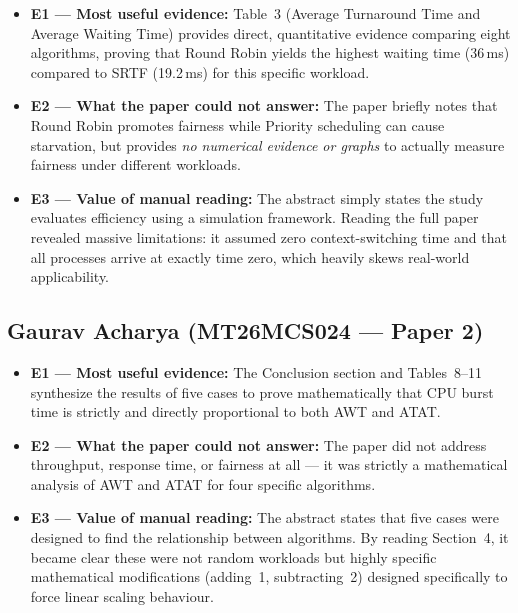 \documentclass[11pt, a4paper]{article}
\begin{document}
\begin{itemize}[nosep]
    \item \textbf{E1 --- Most useful evidence:} Table~3 (Average Turnaround Time and Average Waiting Time) provides direct, quantitative evidence comparing eight algorithms, proving that Round Robin yields the highest waiting time (36\,ms) compared to SRTF (19.2\,ms) for this specific workload.
    
    \item \textbf{E2 --- What the paper could not answer:} The paper briefly notes that Round Robin promotes fairness while Priority scheduling can cause starvation, but provides \emph{no numerical evidence or graphs} to actually measure fairness under different workloads.
    
    \item \textbf{E3 --- Value of manual reading:} The abstract simply states the study evaluates efficiency using a simulation framework. Reading the full paper revealed massive limitations: it assumed zero context-switching time and that all processes arrive at exactly time zero, which heavily skews real-world applicability.
\end{itemize}

\subsection{Gaurav Acharya (MT26MCS024 --- Paper 2)}

\begin{itemize}[nosep]
    \item \textbf{E1 --- Most useful evidence:} The Conclusion section and Tables~8--11 synthesize the results of five cases to prove mathematically that CPU burst time is strictly and directly proportional to both AWT and ATAT.
    
    \item \textbf{E2 --- What the paper could not answer:} The paper did not address throughput, response time, or fairness at all --- it was strictly a mathematical analysis of AWT and ATAT for four specific algorithms.
    
    \item \textbf{E3 --- Value of manual reading:} The abstract states that five cases were designed to find the relationship between algorithms. By reading Section~4, it became clear these were not random workloads but highly specific mathematical modifications (adding~1, subtracting~2) designed specifically to force linear scaling behaviour.
\end{itemize}
\end{document}
